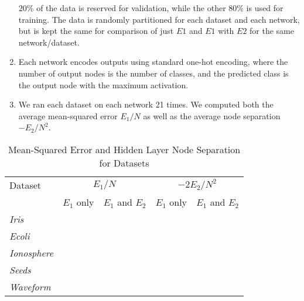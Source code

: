 \begin{enumerate}
  $20\%$ of the data is reserved for validation, while the other $80\%$ is
  used for training. The data is randomly partitioned for each dataset and
  each network, but is kept the same for comparison of just $E1$ and $E1$
  with $E2$ for the same network/dataset.
\item
  Each network encodes outputs using standard one-hot encoding, where the number
  of output nodes is the number of classes, and the predicted class is the
  output node with the maximum activation.
\item
  We ran each dataset on each network 21 times. We computed both the average
  mean-squared error $E_1/N$ as well as the average node separation
  $-E_2/N^2$.
\end{enumerate}

\begin{table}[t]
  \centering
  \small
  \begin{tabular}{|l|r|r|r|r|}
    \hline
    Dataset & 
    \multicolumn{2}{c|}{$E_1/N$} & 
    \multicolumn{2}{c|}{$-2E_2/N^2$} \\
    \cline{2-5}
    & $E_1$ only & $E_1$ and $E_2$ & $E_1$ only & $E_1$ and $E_2$ \\
    \hline
    \textit{Iris} & & & & \\
    \textit{Ecoli} & & & & \\
    \textit{Ionosphere} & & & & \\
    \textit{Seeds} & & & & \\
    \textit{Waveform} & & & & \\
    \hline
  \end{tabular}
  \caption{Mean-Squared Error and Hidden Layer Node Separation for Datasets }
  \label{tab:e1_e2_avgs}  
\end{table}

